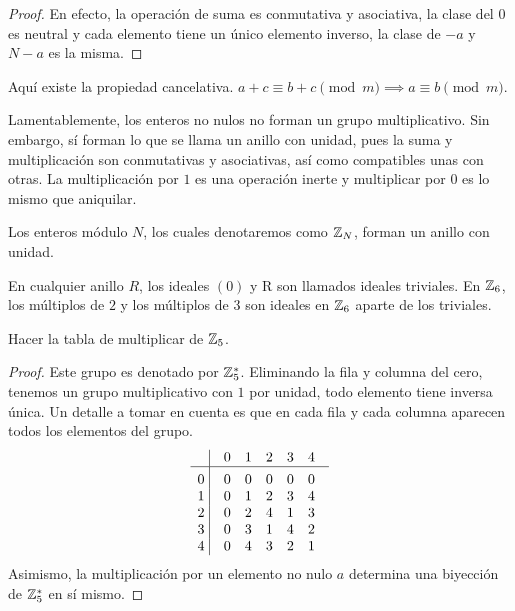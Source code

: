 \documentclass[main.tex]{subfiles}
\begin{document}
\begin{proof}
    En efecto, la operaci\'on de suma es conmutativa y asociativa, la clase del $0$ es neutral y cada elemento tiene un \'unico elemento inverso, la clase de $-a$ y $N - a$ es la misma.
\end{proof}

\begin{remark}
    Aqu\'i existe la propiedad cancelativa. $a + c \equiv b + c \pmod{m} \implies a \equiv b \pmod{m}$.
\end{remark}

Lamentablemente, los enteros no nulos no forman un grupo multiplicativo. Sin embargo, s\'i forman lo que se llama un anillo con unidad, pues la suma y multiplicaci\'on son conmutativas y asociativas, as\'i como compatibles unas con otras. La multiplicaci\'on por $1$ es una operaci\'on inerte y multiplicar por $0$ es lo mismo que aniquilar.

\begin{lemma}
    Los enteros m\'odulo $N$, los cuales denotaremos como $\mathbb Z_N$, forman un anillo con unidad.
\end{lemma}

\begin{example}
    En cualquier anillo $R$, los ideales $(0)$ y R son llamados ideales triviales. En $\mathbb Z_6$, los m\'ultiplos de $2$ y los m\'ultiplos de $3$ son ideales en $\mathbb Z_6$ aparte de los triviales.
\end{example}

\begin{example}
    Hacer la tabla de multiplicar de $\mathbb Z_5$.
\end{example}

\begin{proof}
    Este grupo es denotado por $\mathbb Z_5^*$. Eliminando la fila y columna del cero, tenemos un grupo multiplicativo con $1$ por unidad, todo elemento tiene inversa \'unica. Un detalle a tomar en cuenta es que en cada fila y cada columna aparecen todos los elementos del grupo.
    $$\vbox{\tabskip0.5em\offinterlineskip
    \halign{\strut$#$\hfil\ \tabskip1em\vrule&&$#$\hfil\cr
    ~   & 0   & 1   &2 & 3   & 4\cr
    \noalign{\hrule}\vrule height 12pt width 0pt
    0   & 0   & 0   & 0   & 0   & 0 \cr
    1   & 0   & 1   & 2   & 3   & 4 \cr
    2   & 0   & 2   & 4   & 1   & 3 \cr
    3   & 0   & 3   & 1   & 4   & 2 \cr
    4   & 0   & 4   & 3   & 2   & 1 \cr
}}$$
    Asimismo, la multiplicaci\'on por un elemento no nulo $a$ determina una biyecci\'on de $\mathbb Z_5^*$ en s\'i mismo.
\end{proof}
\end{document}

